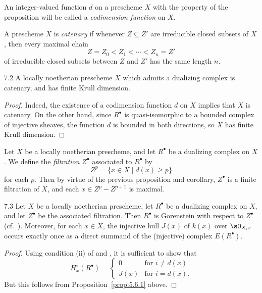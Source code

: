 \begin{definition*}
An integer-valued function $d$ on a prescheme $X$ with the property of the proposition will be called a \emph{codimension function} on $X$.
\end{definition*}

\begin{definition*}
A prescheme $X$ is \emph{catenary} if whenever $Z\subseteq Z'$ are irreducible closed subsets of $X$, then every maximal chain
\[
Z=Z_0<Z_1<\cdots<Z_n=Z'
\]
of irreducible closed subsets between $Z$ and $Z'$ has the same length $n$.
\end{definition*}

\begin{bookcorollary}{7.2}\label{cor:5.7.2}
A locally noetherian prescheme $X$ which admits a dualizing complex is catenary, and has finite Krull dimension.
\end{bookcorollary}

\begin{proof}
Indeed, the existence of a codimension function $d$ on $X$ implies that $X$ is catenary. On the other hand, since $R^\bullet$ is quasi-isomorphic to a bounded complex of injective sheaves, the function $d$ is bounded in both directions, so $X$ has finite Krull dimension.
\end{proof}

\begin{definition*}
Let $X$ be a locally noetherian prescheme, and let $R^\bullet$ be a dualizing complex on $X$. We define the \emph{filtration} $Z^\bullet$ associated to $R^\bullet$ by
\[
Z^{p} = \{x\in X\mid d(x)\geq p\}
\]
for each $p$. Then by virtue of the previous proposition and corollary, $Z^\bullet$ is a finite filtration of $X$, and each $x\in Z^{p}-Z^{p+1}$ is maximal.
\end{definition*}

\begin{bookproposition}{7.3}\label{prop:5.7.3}
Let $X$ be a locally noetherian prescheme, let $R^\bullet$ be a dualizing complex on $X$, and let $Z^\bullet$ be the associated filtration. Then $R^\bullet$ is Gorenstein with respect to $Z^\bullet$ (cf.\ ). Moreover, for each $x\in X$, the injective hull $J(x)$ of $k(x)$ over $\sO_{X,x}$ occurs exactly once as a direct summand of the (injective) complex $E(R^\bullet)$.
\end{bookproposition}

\begin{proof}
Using condition (ii) of  and , it is sufficient to show that
\[
H_{x}^{i}(R^{\bullet}) = \begin{cases} 0 & \text{for } i\neq d(x) \\ J(x) & \text{for } i = d(x). \end{cases}
\]
But this follows from Proposition~\ref{prop:5.6.1} above.
\end{proof}

